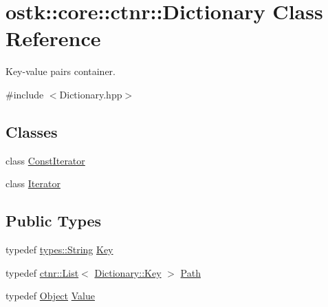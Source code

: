 \hypertarget{classostk_1_1core_1_1ctnr_1_1_dictionary}{}\section{ostk\+:\+:core\+:\+:ctnr\+:\+:Dictionary Class Reference}
\label{classostk_1_1core_1_1ctnr_1_1_dictionary}


Key-\/value pairs container.  




{\ttfamily \#include $<$Dictionary.\+hpp$>$}

\subsection*{Classes}
\begin{DoxyCompactItemize}
\item 
class \hyperlink{classostk_1_1core_1_1ctnr_1_1_dictionary_1_1_const_iterator}{Const\+Iterator}
\item 
class \hyperlink{classostk_1_1core_1_1ctnr_1_1_dictionary_1_1_iterator}{Iterator}
\end{DoxyCompactItemize}
\subsection*{Public Types}
\begin{DoxyCompactItemize}
\item 
typedef \hyperlink{classostk_1_1core_1_1types_1_1_string}{types\+::\+String} \hyperlink{classostk_1_1core_1_1ctnr_1_1_dictionary_aa3b171525039535f342d271d27f90407}{Key}
\item 
typedef \hyperlink{namespaceostk_1_1core_1_1ctnr_a5802e21d045076175dcb310a7045c858}{ctnr\+::\+List}$<$ \hyperlink{classostk_1_1core_1_1ctnr_1_1_dictionary_aa3b171525039535f342d271d27f90407}{Dictionary\+::\+Key} $>$ \hyperlink{classostk_1_1core_1_1ctnr_1_1_dictionary_a16012818d15768ac570985d935c5067c}{Path}
\item 
typedef \hyperlink{classostk_1_1core_1_1ctnr_1_1_object}{Object} \hyperlink{classostk_1_1core_1_1ctnr_1_1_dictionary_ace6ab82268031e972455affca8730c9c}{Value}
\end{DoxyCompactItemize}
